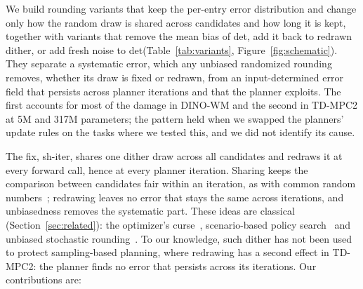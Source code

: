 \documentclass[10pt]{article}
\newcommand{\dtm}{\textsf{det}\xspace}
\newcommand{\shiter}{\textsf{sh-iter}\xspace}
\begin{document}
We build rounding variants that keep the per-entry error distribution and change only how the random draw is shared across candidates and how long it is kept, together with variants that remove the mean bias of \dtm, add it back to redrawn dither, or add fresh noise to \dtm (Table~\ref{tab:variants}, Figure~\ref{fig:schematic}). They separate a systematic error, which any unbiased randomized rounding removes, whether its draw is fixed or redrawn, from an input-determined error field that persists across planner iterations and that the planner exploits. The first accounts for most of the damage in DINO-WM and the second in TD-MPC2 at 5M and 317M parameters; the pattern held when we swapped the planners' update rules on the tasks where we tested this, and we did not identify its cause.

The fix, \shiter, shares one dither draw across all candidates and redraws it at every forward call, hence at every planner iteration. Sharing keeps the comparison between candidates fair within an iteration, as with common random numbers~\citep{kleinman1999crn}; redrawing leaves no error that stays the same across iterations, and unbiasedness removes the systematic part. These ideas are classical (Section~\ref{sec:related}): the optimizer's curse~\citep{smith2006curse}, scenario-based policy search~\citep{ng2000pegasus, strens2002paired} and unbiased stochastic rounding~\citep{gupta2015limited, croci2022sr}. To our knowledge, such dither has not been used to protect sampling-based planning, where redrawing has a second effect in TD-MPC2: the planner finds no error that persists across its iterations. Our contributions are:
\end{document}
